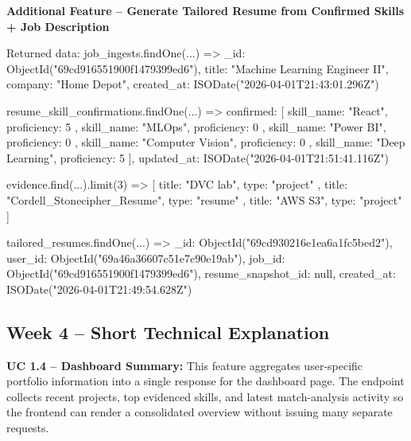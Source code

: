 \documentclass[11pt]{article}
\begin{document}
\noindent
\textbf{Additional Feature -- Generate Tailored Resume from Confirmed Skills + Job Description}
\begin{TerminalBlock}
Returned data:
job_ingests.findOne(...) =>
{
  _id: ObjectId("69cd916551900f1479399ed6"),
  title: "Machine Learning Engineer II",
  company: "Home Depot",
  created_at: ISODate("2026-04-01T21:43:01.296Z")
}

resume_skill_confirmations.findOne(...) =>
{
  confirmed: [
    { skill_name: "React", proficiency: 5 },
    { skill_name: "MLOps", proficiency: 0 },
    { skill_name: "Power BI", proficiency: 0 },
    { skill_name: "Computer Vision", proficiency: 0 },
    { skill_name: "Deep Learning", proficiency: 5 }
  ],
  updated_at: ISODate("2026-04-01T21:51:41.116Z")
}

evidence.find(...).limit(3) =>
[
  { title: "DVC lab", type: "project" },
  { title: "Cordell_Stonecipher_Resume", type: "resume" },
  { title: "AWS S3", type: "project" }
]

tailored_resumes.findOne(...) =>
{
  _id: ObjectId("69cd930216e1ea6a1fc5bed2"),
  user_id: ObjectId("69a46a36607c51e7c90e19ab"),
  job_id: ObjectId("69cd916551900f1479399ed6"),
  resume_snapshot_id: null,
  created_at: ISODate("2026-04-01T21:49:54.628Z")
}
\end{TerminalBlock}

\subsection*{Week 4 -- Short Technical Explanation}

\noindent
\textbf{UC 1.4 -- Dashboard Summary:}
This feature aggregates user-specific portfolio information into a single response for the dashboard page. The endpoint collects recent projects, top evidenced skills, and latest match-analysis activity so the frontend can render a consolidated overview without issuing many separate requests.
\end{document}
